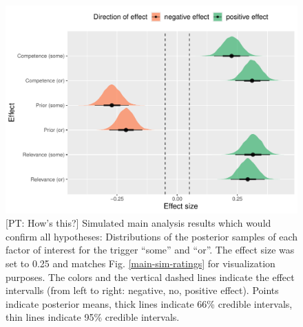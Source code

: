 \documentclass{sp}
\newcommand{\pt}[1]{\textcolor{Cerulean}{[PT: #1]}}
\begin{document}
\begin{figure}[h]
	\begin{center}
		\includegraphics[width=1\linewidth]{images/posterior-effects-idealized-sim.pdf}
	\end{center}
	\vspace{-0.3cm}
	\caption{ \pt{How's this?} Simulated main analysis results which would confirm all hypotheses: Distributions of the posterior samples of each factor of interest for the trigger ``some'' and ``or''. The effect size was set to 0.25 and matches Fig. \ref{main-sim-ratings} for visualization purposes. The colors and the vertical dashed lines indicate the effect intervalls (from left to right: negative, no, positive effect). Points indicate posterior means, thick lines indicate 66\% credible intervals, thin lines indicate 95\% credible intervals.}
	\label{posteriors-sim}
\end{figure}
\end{document}
